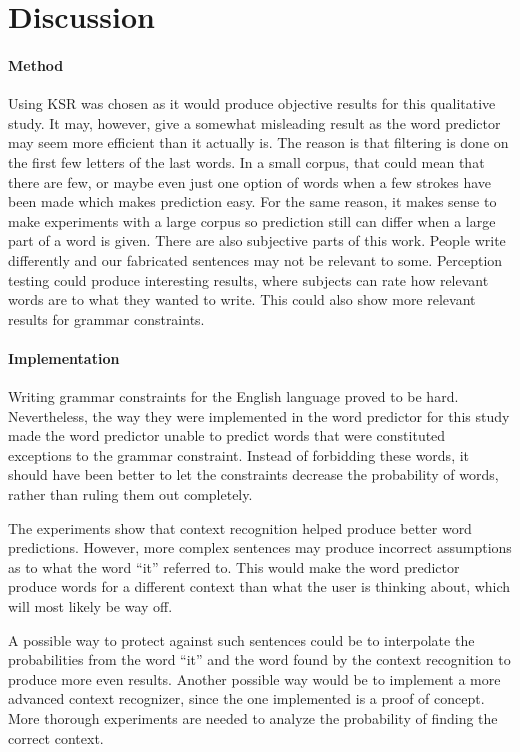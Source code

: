 \section{Discussion}

\paragraph{Method}
Using KSR was chosen as it would produce objective results for this qualitative study. It may, however, give a somewhat misleading result as the word predictor may seem more efficient than it actually is. The reason is that filtering is done on the first few letters of the last words. In a small corpus, that could mean that there are few, or maybe even just one option of words when a few strokes have been made which makes prediction easy. For the same reason, it makes sense to make experiments with a large corpus so prediction still can differ when a large part of a word is given. There are also subjective parts of this work. People write differently and our fabricated sentences may not be relevant to some. Perception testing could produce interesting results, where subjects can rate how relevant words are to what they wanted to write. This could also show more relevant results for grammar constraints.

\paragraph{Implementation}
Writing grammar constraints for the English language proved to be hard. Nevertheless, the way they were implemented in the word predictor for this study made the word predictor unable to predict words that were constituted exceptions to the grammar constraint. Instead of forbidding these words, it should have been better to let the constraints decrease the probability of words, rather than ruling them out completely.

The experiments show that context recognition helped produce better word predictions. However, more complex sentences may produce incorrect assumptions as to what the word “it” referred to. This would make the word predictor produce words for a different context than what the user is thinking about, which will most likely be way off.

A possible way to protect against such sentences could be to interpolate the probabilities from the word “it” and the word found by the context recognition to produce more even results. Another possible way would be to implement a more advanced context recognizer, since the one implemented is a proof of concept. More thorough experiments are needed to analyze the probability of finding the correct context.


